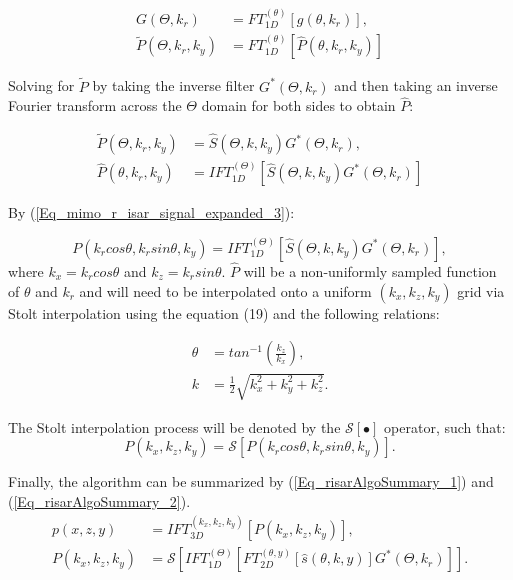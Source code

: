 \documentclass[conference]{IEEEtran}
\begin{document}
		\begin{align}
		G(\Theta,k_r) &= FT_{1D}^{(\theta)}[g(\theta,k_r)],\\
		\tilde{P}(\Theta,k_r,k_y) &= FT_{1D}^{(\theta)}[\hat{P}(\theta,k_r,k_y)]
		\end{align}
		
		Solving for $\tilde{P}$ by taking the inverse filter $G^*(\Theta,k_r)$ and then taking an inverse Fourier transform across the $\Theta$ domain for both sides to obtain $\hat{P}$:
		
		\begin{align}
		\tilde{P}(\Theta,k_r,k_y) &= \hat{S}(\Theta,k,k_y)G^*(\Theta,k_r), \\
		\hat{P}(\theta,k_r,k_y) &= IFT_{1D}^{(\Theta)}\left[ \hat{S}(\Theta,k,k_y)G^*(\Theta,k_r) \right]
		\end{align}
		
		By (\ref{Eq_mimo_r_isar_signal_expanded_3}):
		
		\begin{equation}
		P(k_r cos\theta,k_r sin\theta,k_y) = IFT_{1D}^{(\Theta)}\left[ \hat{S}(\Theta,k,k_y)G^*(\Theta,k_r) \right],
		\end{equation}
		where $k_x = k_r cos\theta$ and $k_z = k_r sin\theta$. $\hat{P}$ will be a non-uniformly sampled function of $\theta$ and $k_r$ and will need to be interpolated onto a uniform $(k_x,k_z,k_y)$ grid via Stolt interpolation using the equation (19) and the following relations:
		
		\begin{align}
		\label{Eq_stolt_2}
		\theta &= tan^{-1}\left(\frac{k_z}{k_x}\right), \\
		\label{Eq_stolt_3}
		k &= \frac{1}{2}\sqrt{k_x^2 + k_y^2 + k_z^2}.
		\end{align}
		
		The Stolt interpolation process will be denoted by the $\mathcal{S}[\bullet]$ operator, such that:
		\begin{equation}
		P(k_x,k_z,k_y) = \mathcal{S}[P(k_r cos\theta,k_r sin\theta,k_y)].
		\end{equation}
		
		Finally, the algorithm can be summarized by (\ref{Eq_risarAlgoSummary_1}) and (\ref{Eq_risarAlgoSummary_2}).
		\begin{align}
		\label{Eq_risarAlgoSummary_1}
		p(x,z,y) &= IFT_{3D}^{(k_x,k_z,k_y)}\left[ P(k_x,k_z,k_y) \right], \\
		\label{Eq_risarAlgoSummary_2}
		P(k_x,k_z,k_y) &= \mathcal{S}\left[IFT_{1D}^{(\Theta)}\left[ FT_{2D}^{(\theta,y)}\left[\hat{s}(\theta,k,y)\right]G^*(\Theta,k_r)\right]\right].
		\end{align}
		
\end{document}
